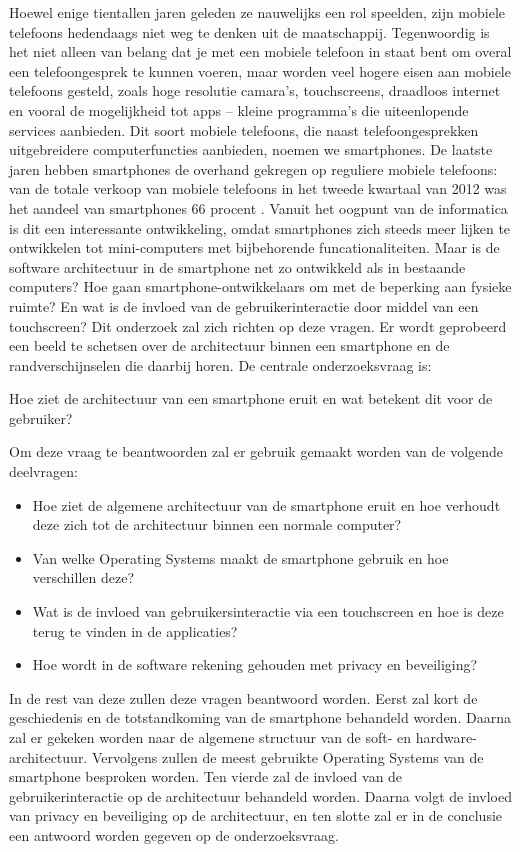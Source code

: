 Hoewel enige tientallen jaren geleden ze nauwelijks een rol speelden, zijn mobiele telefoons hedendaags niet weg te denken uit de maatschappij.
Tegenwoordig is het niet alleen van belang dat je met een mobiele telefoon in staat bent om overal een telefoongesprek te kunnen voeren, maar worden veel hogere eisen aan mobiele telefoons gesteld, zoals hoge resolutie camara's, touchscreens, draadloos internet en vooral de mogelijkheid tot apps -- kleine programma's die uiteenlopende services aanbieden.
Dit soort mobiele telefoons, die naast telefoongesprekken uitgebreidere computerfuncties aanbieden, noemen we smartphones.
De laatste jaren hebben smartphones de overhand gekregen op reguliere mobiele telefoons: van de totale verkoop van mobiele telefoons in het tweede kwartaal van 2012 was het aandeel van smartphones 66 procent \citep{GsmHelpDesk}.
Vanuit het oogpunt van de informatica is dit een interessante ontwikkeling, omdat smartphones zich steeds meer lijken te ontwikkelen tot mini-computers met bijbehorende funcationaliteiten.
Maar is de software architectuur in de smartphone net zo ontwikkeld als in bestaande computers?
Hoe gaan smartphone-ontwikkelaars om met de beperking aan fysieke ruimte?
En wat is de invloed van de gebruikerinteractie door middel van een touchscreen?
Dit onderzoek zal zich richten op deze vragen.
Er wordt geprobeerd een beeld te schetsen over de architectuur binnen een smartphone en de randverschijnselen die daarbij horen.
De centrale onderzoeksvraag is: 

Hoe ziet de architectuur van een smartphone eruit en wat betekent dit voor de gebruiker?

Om deze vraag te beantwoorden zal er gebruik gemaakt worden van de volgende deelvragen:

\begin{itemize}
   \item Hoe ziet de algemene architectuur van de smartphone eruit en hoe verhoudt deze zich tot de architectuur binnen een normale computer?
   \item Van welke Operating Systems maakt de smartphone gebruik en hoe verschillen deze?
   \item Wat is de invloed van gebruikersinteractie via een touchscreen en hoe is deze terug te vinden in de applicaties?
   \item Hoe wordt in de software rekening gehouden met privacy en beveiliging?
\end{itemize}

In de rest van deze zullen deze vragen beantwoord worden.
Eerst zal kort de geschiedenis en de totstandkoming van de smartphone behandeld worden.
Daarna zal er gekeken worden naar de algemene structuur van de soft- en hardware-architectuur.
Vervolgens zullen de meest gebruikte Operating Systems van de smartphone besproken worden.
Ten vierde zal de invloed van de gebruikerinteractie op de architectuur behandeld worden.
Daarna volgt de invloed van privacy en beveiliging op de architectuur, en ten slotte zal er in de conclusie een antwoord worden gegeven op de onderzoeksvraag.


